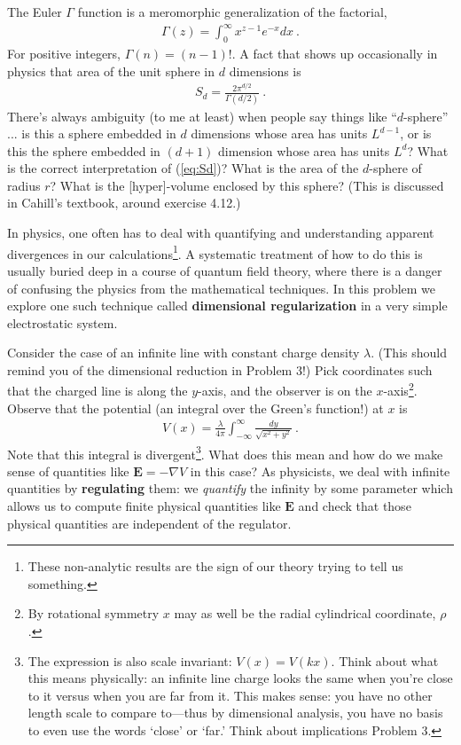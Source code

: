 \documentclass[12pt]{article}
\numberwithin{equation}{section}    %
\renewcommand{\vec}[1]{\mathbf{#1}} %
\begin{document}

The Euler $\Gamma$ function is a meromorphic generalization of the factorial,
\begin{align}
	\Gamma(z) = \int_0^\infty x^{z-1}e^{-x} dx \ .
	\label{eq:Gamma}
\end{align}
For positive integers, $\Gamma(n) = (n-1)!$.
A fact that shows up occasionally in physics that area of the unit sphere in $d$ dimensions is
\begin{align}
	S_d = \frac{2\pi^{d/2}}{\Gamma(d/2)} \ .
	\label{eq:Sd}
\end{align}
There's always ambiguity (to me at least) when people say things like ``$d$-sphere'' ... is this a sphere embedded in $d$ dimensions whose area has units $L^{d-1}$, or is this the sphere embedded in $(d+1)$ dimension whose area has units $L^d$? What is the correct interpretation of (\ref{eq:Sd})? What is the area of the $d$-sphere of radius $r$? What is the [hyper]-volume enclosed by this sphere? (This is discussed in Cahill's textbook, around exercise 4.12.)



In physics, one often has to deal with quantifying and understanding apparent divergences in our calculations\footnote{These non-analytic results are the sign of our theory trying to tell us something.}. A systematic treatment of how to do this is usually buried deep in a course of quantum field theory, where there is a danger of confusing the physics from the mathematical techniques. In this problem we explore one such technique called \textbf{dimensional regularization} in a very simple electrostatic system. 

Consider the case of an infinite line  with constant charge density $\lambda$. (This should remind you of the dimensional reduction in Problem 3!) Pick coordinates such that the charged line is along the $y$-axis, and the observer is on the $x$-axis\footnote{By rotational symmetry $x$ may as well be the radial cylindrical coordinate, $\rho$.}. Observe that the potential (an integral over the Green's function!) at $x$ is
\begin{align}
	V(x) = \frac{\lambda}{4\pi} \int_{-\infty}^\infty \frac{dy}{\sqrt{x^2+y^2}} \ .
	\label{eq:Vx:1d}
\end{align}
Note that this integral is divergent\footnote{The expression is also scale invariant: $V(x) = V(kx)$. Think about what this means physically: an infinite line charge looks the same when you're close to it versus when you are far from it. This makes sense: you have no other length scale to compare to---thus by dimensional analysis, you have no basis to even use the words `close' or `far.' Think about implications Problem 3.}. What does this mean and how do we make sense of quantities like $\vec E = -\nabla V$ in this case? As physicists, we deal with infinite quantities by \textbf{regulating} them: we \emph{quantify} the infinity by some parameter which allows us to compute finite physical quantities like $\vec E$ and check that those physical quantities are independent of the regulator.
\end{document}
